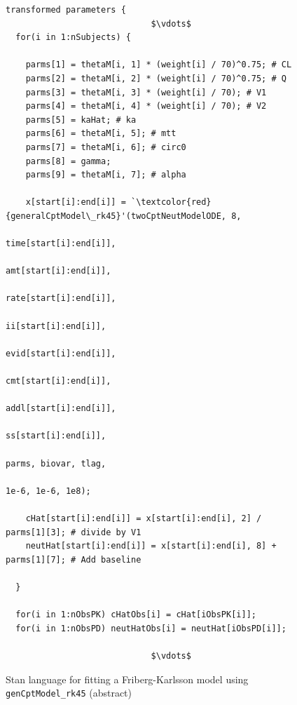 \documentclass[11pt]{amsart}
\newenvironment{fmpage}[1]
     {\begin{lrbox}{\fmbox}\begin{minipage}{#1}}
     {\end{minipage}\end{lrbox}\fbox{\usebox{\fmbox}}}
\begin{document}
\begin{figure}
\caption{Stan language for fitting a Friberg-Karlsson model using \texttt{genCptModel\_rk45} (abstract)}
\begin{tiny}
\begin{center}
\begin{fmpage}{\textwidth - .75in}
\begin{lstlisting}[basicstyle=\tiny\ttfamily,mathescape=true,flexiblecolumns=true,frame=single,escapeinside=`']
transformed parameters {
                             $\vdots$
  for(i in 1:nSubjects) {

    parms[1] = thetaM[i, 1] * (weight[i] / 70)^0.75; # CL
    parms[2] = thetaM[i, 2] * (weight[i] / 70)^0.75; # Q
    parms[3] = thetaM[i, 3] * (weight[i] / 70); # V1
    parms[4] = thetaM[i, 4] * (weight[i] / 70); # V2
    parms[5] = kaHat; # ka
    parms[6] = thetaM[i, 5]; # mtt
    parms[7] = thetaM[i, 6]; # circ0
    parms[8] = gamma;
    parms[9] = thetaM[i, 7]; # alpha

    x[start[i]:end[i]] = `\textcolor{red}{generalCptModel\_rk45}'(twoCptNeutModelODE, 8,
                                                           time[start[i]:end[i]], 
                                                           amt[start[i]:end[i]], 
                                                           rate[start[i]:end[i]], 
                                                           ii[start[i]:end[i]], 
                                                           evid[start[i]:end[i]], 
                                                           cmt[start[i]:end[i]], 
                                                           addl[start[i]:end[i]], 
                                                           ss[start[i]:end[i]],
                                                           parms, biovar, tlag,
                                                           1e-6, 1e-6, 1e8);
                             
    cHat[start[i]:end[i]] = x[start[i]:end[i], 2] / parms[1][3]; # divide by V1
    neutHat[start[i]:end[i]] = x[start[i]:end[i], 8] + parms[1][7]; # Add baseline
    
  }
  
  for(i in 1:nObsPK) cHatObs[i] = cHat[iObsPK[i]];
  for(i in 1:nObsPD) neutHatObs[i] = neutHat[iObsPD[i]];

                             $\vdots$  
\end{lstlisting}
\end{fmpage}
\end{center}
\end{tiny} 
\label{FKCode}
\end{figure}
\end{document}
